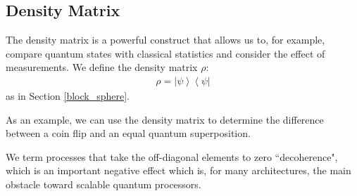 \documentclass[11pt]{article} %
\newcommand{\bra}[1]{\left\langle #1 \right|}
\newcommand{\ket}[1]{\left|#1\right\rangle}
\begin{document}
\subsection{Density Matrix}
The density matrix is a powerful construct that allows us to, for example, compare quantum states with classical statistics and consider the effect of measurements. We define the density matrix $\rho$:
\begin{align}
    \rho = \ket{\psi}\bra{\psi}
\end{align}
as in Section \ref{block_sphere}.

As an example, we can use the density matrix to determine the difference between a coin flip and an equal quantum superposition.

We term processes that take the off-diagonal elements to zero ``decoherence", which is an important negative effect which is, for many architectures, the main obstacle toward scalable quantum processors.
\end{document}
